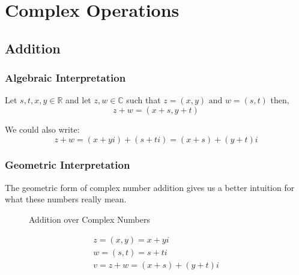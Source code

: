 \documentclass[10pt]{article}
\begin{document}
\section*{Complex Operations}
\label{sec:compops}

\subsection*{Addition}
\label{subsec:addition}

\subsubsection*{Algebraic Interpretation}
\label{subsubsec:algint}
Let $s,t,x,y \in \mathbb{R}$ and let $z,w \in \mathbb{C}$ such that  $z = (x,y) \text{ and } w = (s,t)$ then,
\[ z + w = (x+s, y+t) \]

We could also write:
\[ z + w = (x + yi) + (s + ti) = (x + s) + (y + t)i \] 


\subsubsection*{Geometric Interpretation}

The geometric form of complex number addition gives us a better intuition for what these numbers really mean. 

\begin{figure}[h!]
\begin{center}
\caption{Addition over Complex Numbers}
\end{center}
\end{figure}

\begin{eqnarray*}
z = (x, y) = x + yi \\
w = (s, t) = s + ti \\
v = z + w = (x + s) + (y + t)i \\
\end{eqnarray*}
\end{document}
